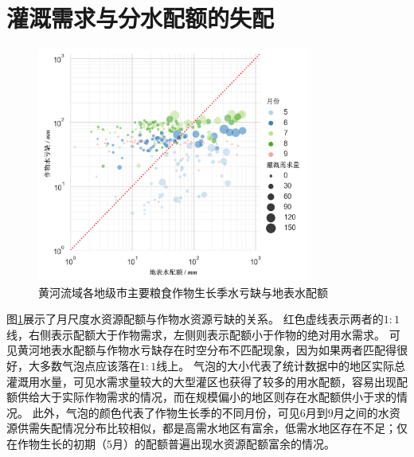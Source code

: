 \section{灌溉需求与分水配额的失配}

\begin{figure}[!ht]
    \centering
    \includegraphics[width=0.8\textwidth]{img/ch6/ch6_matches.png}
    \caption{黄河流域各地级市主要粮食作物生长季水亏缺与地表水配额}\label{ch6:fig:matches}
\end{figure}

图\ref{ch6:fig:matches}展示了月尺度水资源配额与作物水资源亏缺的关系。
红色虚线表示两者的$1:1$线，右侧表示配额大于作物需求，左侧则表示配额小于作物的绝对用水需求。
可见黄河地表水配额与作物水亏缺存在时空分布不匹配现象，因为如果两者匹配得很好，大多数气泡点应该落在$1:1$线上。
气泡的大小代表了统计数据中的地区实际总灌溉用水量，可见水需求量较大的大型灌区也获得了较多的用水配额，容易出现配额供给大于实际作物需求的情况，而在规模偏小的地区则存在水配额供小于求的情况。
此外，气泡的颜色代表了作物生长季的不同月份，可见$6$月到$9$月之间的水资源供需失配情况分布比较相似，都是高需水地区有富余，低需水地区存在不足；仅在作物生长的初期（$5$月）的配额普遍出现水资源配额富余的情况。



